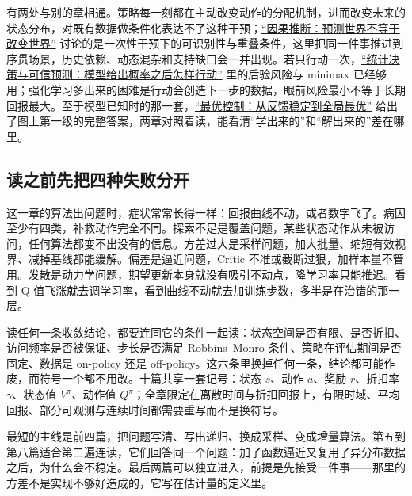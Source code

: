 有两处与别的章相通。策略每一刻都在主动改变动作的分配机制，进而改变未来的状态分布，对既有数据做条件化表达不了这种干预；\hyperref[ch:120]{``因果推断：预测世界不等于改变世界''} 讨论的是一次性干预下的可识别性与重叠条件，这里把同一件事推进到序贯场景，历史依赖、动态混杂和支持缺口会一并出现。若只行动一次，\hyperref[ch:092]{``统计决策与可信预测：模型给出概率之后怎样行动''} 里的后验风险与 minimax 已经够用；强化学习多出来的困难是行动会创造下一步的数据，眼前风险最小不等于长期回报最大。至于模型已知时的那一套，\hyperref[ch:138]{``最优控制：从反馈稳定到全局最优''} 给出了图上第一级的完整答案，两章对照着读，能看清``学出来的''和``解出来的''差在哪里。

\subsection{读之前先把四种失败分开}

这一章的算法出问题时，症状常常长得一样：回报曲线不动，或者数字飞了。病因至少有四类，补救动作完全不同。探索不足是覆盖问题，某些状态动作从未被访问，任何算法都变不出没有的信息。方差过大是采样问题，加大批量、缩短有效视界、减掉基线都能缓解。偏差是逼近问题，Critic 不准或截断过狠，加样本量不管用。发散是动力学问题，期望更新本身就没有吸引不动点，降学习率只能推迟。看到 Q 值飞涨就去调学习率，看到曲线不动就去加训练步数，多半是在治错的那一层。

读任何一条收敛结论，都要连同它的条件一起读：状态空间是否有限、是否折扣、访问频率是否被保证、步长是否满足 Robbins--Monro 条件、策略在评估期间是否固定、数据是 on-policy 还是 off-policy。这六条里换掉任何一条，结论都可能作废，而符号一个都不用改。十篇共享一套记号：状态 \(s\)、动作 \(a\)、奖励 \(r\)、折扣率 \(\gamma\)、状态值 \(V^\pi\)、动作值 \(Q^\pi\)；全章限定在离散时间与折扣回报上，有限时域、平均回报、部分可观测与连续时间都需要重写而不是换符号。

最短的主线是前四篇，把问题写清、写出递归、换成采样、变成增量算法。第五到第八篇适合第二遍连读，它们回答同一个问题：加了函数逼近又复用了异分布数据之后，为什么会不稳定。最后两篇可以独立进入，前提是先接受一件事——那里的方差不是实现不够好造成的，它写在估计量的定义里。
